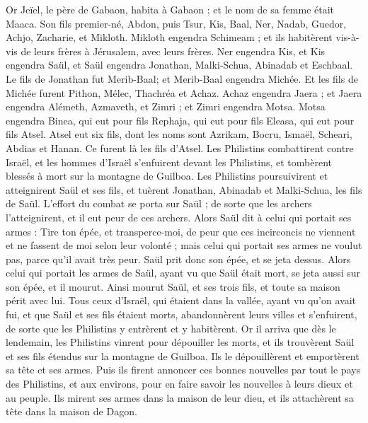 \begin{multicols}{2}
Or Jeïel, le père de Gabaon, habita à Gabaon ; et le nom de sa femme était Maaca.
Son fils premier-né, Abdon, puis Tsur, Kis, Baal, Ner, Nadab,
Guedor, Achjo, Zacharie, et Mikloth.
Mikloth engendra Schimeam ; et ils habitèrent vis-à-vis de leurs frères à Jérusalem, avec leurs frères.
Ner engendra Kis, et Kis engendra Saül, et Saül engendra Jonathan, Malki-Schua, Abinadab et Eschbaal.
Le fils de Jonathan fut Merib-Baal; et Merib-Baal engendra Michée.
Et les fils de Michée furent Pithon, Mélec, Thachréa et Achaz.
Achaz engendra Jaera ; et Jaera engendra Alémeth, Azmaveth, et Zimri ; et Zimri engendra Motsa.
Motsa engendra Binea, qui eut pour fils Rephaja, qui eut pour fils Eleasa, qui eut pour fils Atsel.
Atsel eut six fils, dont les noms sont Azrikam, Bocru, Ismaël, Scheari, Abdias et Hanan. Ce furent là les fils d'Atsel.
\VerseOne{}Les Philistins combattirent contre Israël, et les hommes d'Israël s'enfuirent devant les Philistins, et tombèrent blessés à mort sur la montagne de Guilboa.
Les Philistins poursuivirent et atteignirent Saül et ses fils, et tuèrent Jonathan, Abinadab et Malki-Schua, les fils de Saül.
L'effort du combat se porta sur Saül ; de sorte que les archers l'atteignirent, et il eut peur de ces archers.
Alors Saül dit à celui qui portait ses armes : Tire ton épée, et transperce-moi, de peur que ces incirconcis ne viennent et ne fassent de moi selon leur volonté ; mais celui qui portait ses armes ne voulut pas, parce qu'il avait très peur. Saül prit donc son épée, et se jeta dessus.
Alors celui qui portait les armes de Saül, ayant vu que Saül était mort, se jeta aussi sur son épée, et il mourut.
Ainsi mourut Saül, et ses trois fils, et toute sa maison périt avec lui.
Tous ceux d'Israël, qui étaient dans la vallée, ayant vu qu'on avait fui, et que Saül et ses fils étaient morts, abandonnèrent leurs villes et s'enfuirent, de sorte que les Philistins y entrèrent et y habitèrent.
Or il arriva que dès le lendemain, les Philistins vinrent pour dépouiller les morts, et ils trouvèrent Saül et ses fils étendus sur la montagne de Guilboa.
Ils le dépouillèrent et emportèrent sa tête et ses armes. Puis ils firent annoncer ces bonnes nouvelles par tout le pays des Philistins, et aux environs, pour en faire savoir les nouvelles à leurs dieux et au peuple.
Ils mirent ses armes dans la maison de leur dieu, et ils attachèrent sa tête dans la maison de Dagon.

\end{multicols}
